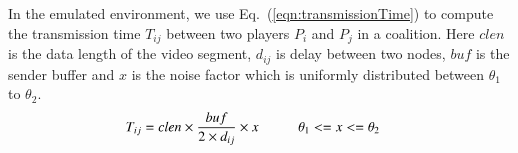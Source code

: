 In the emulated environment, we use Eq.~(\ref{eqn:transmissionTime}) to compute the transmission time $T_{ij}$ between two players $P_i$ and $P_j$ in a coalition. Here $clen$ is the data length of the video segment, $d_{ij}$ is delay between two nodes, $buf$ is the sender buffer and $x$ is the noise factor which is uniformly distributed between $\theta_1$ to $\theta_2$. 
\begin{align}
T_{ij} = clen\times \frac{buf}{2\times d_{ij}} \times x \mbox{\hspace{1cm}}& \theta_1 <= x <= \theta_2  
\label{eqn:transmissionTime}
\end{align}



%








